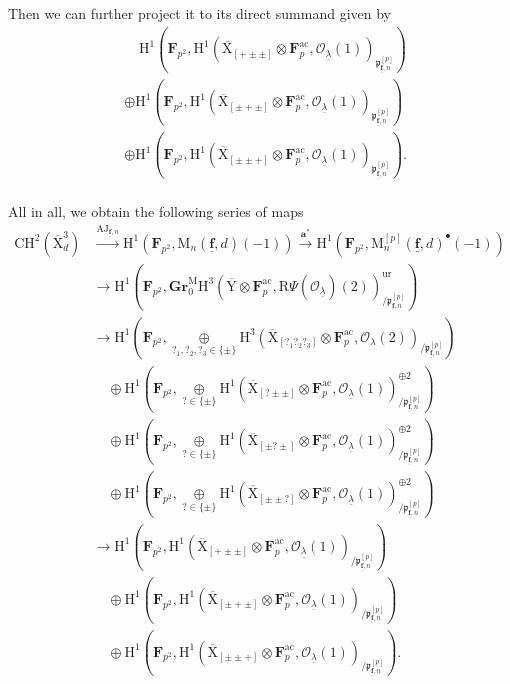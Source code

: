 \documentclass[10pt]{amsart}
\numberwithin{equation}{section}
\theoremstyle{plain}
\numberwithin{equation}{section}
\theoremstyle{definition}
\theoremstyle{remark}
\def\AJ{\mathrm{AJ}}
\def\ac{\mathrm{ac}}
\def\ur{\mathrm{ur}}
\def\ac{\mathrm{ac}}
\def\undlamb{\underline{\lambda}}
\def\triplef{\underline{\mathbf{f}}}
\def\triplepnp {{\frakp}^{[p]}_{\triplef, n}}
\def\calO{\mathcal{O}}
\def\frakp{\mathfrak{p}}
\def\FF{\mathbf{F}}
\def\rmH{\mathrm{H}}
\def\rmM{\mathrm{M}}
\def\rmX{\mathrm{X}}
\def\rmXbar{\overline{\rmX}}
\def\rmY{\mathrm{Y}}
\def\rmR{\mathrm{R}}
\newcommand{\Gr}{\mathbf{Gr}}
\begin{document}
Then we can further project it to its direct summand given by
\begin{equation*}
\begin{aligned}
&\phantom{aa}\rmH^{1}(\FF_{p^{2}}, \rmH^{1}(\rmXbar_{[+\pm\pm]}\otimes{\FF^{\ac}_{p}}, \calO_{\undlamb}(1))_{\triplepnp})\\
&\oplus \rmH^{1}(\FF_{p^{2}}, \rmH^{1}(\rmXbar_{[\pm+\pm]}\otimes{\FF^{\ac}_{p}}, \calO_{\undlamb}(1))_{\triplepnp})\\
&\oplus \rmH^{1}(\FF_{p^{2}}, \rmH^{1}(\rmXbar_{[\pm\pm+]}\otimes{\FF^{\ac}_{p}}, \calO_{\undlamb}(1))_{\triplepnp}).\\
\end{aligned}
\end{equation*} 

All in all, we obtain the following series of maps
\begin{equation*}
\begin{aligned}
\mathrm{CH}^{2}(\overline{\rmX}^{3}_{d})&\xrightarrow{{\AJ}_{\triplef, n}} \rmH^{1}(\FF_{p^{2}}, \rmM_{n}(\triplef, d)(-1))\xrightarrow{\mathbf{a}^{\ast}} \rmH^{1}(\FF_{p^{2}}, \rmM^{[p]}_{n}(\triplef, d)^{\bullet}(-1))\\
&\longrightarrow \rmH^{1}(\FF_{p^{2}}, \Gr^{\rmM}_{0}\rmH^{3}(\overline{\rmY}\otimes\FF^{\ac}_{p}, \rmR\Psi(\calO_{\undlamb})(2))^{\ur}_{/\triplepnp})\\
&\longrightarrow \rmH^{1}(\FF_{p^{2}}, \underset{?_{1}, ?_{2}, ?_{3}\in\{\pm\}}\oplus\rmH^{3}(\rmXbar_{[?_{1}?_{2}?_{3}]}\otimes{\FF^{\ac}_{p}}, \calO_{\lambda}(2))_{/\triplepnp})\\
&\phantom{aa}\oplus\rmH^{1}(\FF_{p^{2}}, \underset{?\in\{\pm\}}\oplus\rmH^{1}(\rmXbar_{[?\pm\pm]}\otimes{\FF^{\ac}_{p}}, \calO_{\undlamb}(1))^{\oplus2}_{/\triplepnp})\\
&\phantom{aa}\oplus \rmH^{1}(\FF_{p^{2}}, \underset{?\in\{\pm\}}\oplus\rmH^{1}(\rmXbar_{[\pm?\pm]}\otimes{\FF^{\ac}_{p}}, \calO_{\undlamb}(1))^{\oplus2}_{/\triplepnp})\\
&\phantom{aa}\oplus \rmH^{1}(\FF_{p^{2}}, \underset{?\in\{\pm\}}\oplus\rmH^{1}(\rmXbar_{[\pm\pm?]}\otimes{\FF^{\ac}_{p}}, \calO_{\undlamb}(1))^{\oplus2}_{/\triplepnp})\\
&\longrightarrow\rmH^{1}(\FF_{p^{2}}, \rmH^{1}(\rmXbar_{[+\pm\pm]}\otimes{\FF^{\ac}_{p}}, \calO_{\undlamb}(1))_{/\triplepnp})\\
&\phantom{aa}\oplus \rmH^{1}(\FF_{p^{2}}, \rmH^{1}(\rmXbar_{[\pm+\pm]}\otimes{\FF^{\ac}_{p}}, \calO_{\undlamb}(1))_{/\triplepnp})\\
&\phantom{aa}\oplus \rmH^{1}(\FF_{p^{2}}, \rmH^{1}(\rmXbar_{[\pm\pm+]}\otimes{\FF^{\ac}_{p}}, \calO_{\undlamb}(1))_{/\triplepnp}).\\
\end{aligned}
\end{equation*}
\end{document}
